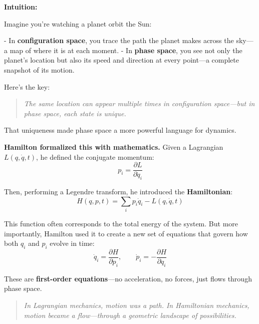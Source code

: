   
  \vspace{1em}
  \textbf{Intuition:}
  
  Imagine you're watching a planet orbit the Sun:
  
  - In \textbf{configuration space}, you trace the path the planet makes across the sky—a map of where it is at each moment.
  - In \textbf{phase space}, you see not only the planet’s location but also its speed and direction at every point—a complete snapshot of its motion.
  
  Here’s the key:
  \begin{quote}
      \textit{The same location can appear multiple times in configuration space—but in phase space, each state is unique.}
  \end{quote}
  
  That uniqueness made phase space a more powerful language for dynamics.
  
  \vspace{1em}
  
  \textbf{Hamilton formalized this with mathematics.} Given a Lagrangian \( L(q, \dot{q}, t) \), he defined the conjugate momentum:
  \[
  p_i = \frac{\partial L}{\partial \dot{q}_i}
  \]
  
  Then, performing a Legendre transform, he introduced the \textbf{Hamiltonian}:
  \[
  H(q, p, t) = \sum_i p_i \dot{q}_i - L(q, \dot{q}, t)
  \]
  
  This function often corresponds to the total energy of the system. But more importantly, Hamilton used it to create a new set of equations that govern how both \( q_i \) and \( p_i \) evolve in time:
  \[
  \dot{q}_i = \frac{\partial H}{\partial p_i}, \qquad \dot{p}_i = -\frac{\partial H}{\partial q_i}
  \]
  
  These are \textbf{first-order equations}—no acceleration, no forces, just flows through phase space.
  
  \begin{quote}
      \textit{In Lagrangian mechanics, motion was a path. In Hamiltonian mechanics, motion became a flow—through a geometric landscape of possibilities.}
  \end{quote}


